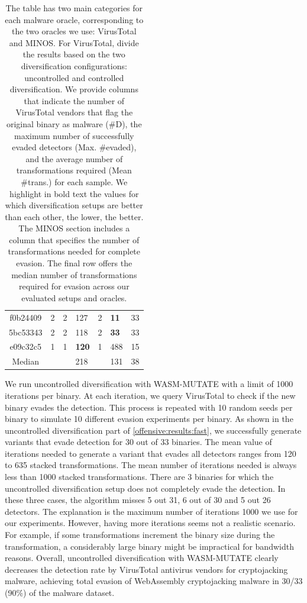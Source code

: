 \begin{table}
\begin{tabular}{c | r | r l | r l | t }
        f0b24409 &                  2 &         2       &  127  & 2 & \textbf{11} & 33 \\
        5bc53343 &                  2 &         2       &  118  & 2 & \textbf{33} & 33 \\
        e09c32c5 &                  1 &         1       &  \textbf{120}  & 1 & 488 & 15 \\
        \hline\hline
        Median &                         &         &      218  &   & 131 & 38
    \end{tabular}
    \caption{
        The table has two main categories for each malware oracle, corresponding to the two oracles we use: VirusTotal and MINOS. 
        For VirusTotal, divide the results based on the two diversification configurations: uncontrolled and controlled diversification. 
        We provide columns that indicate the number of VirusTotal vendors that flag the original binary as malware (\#D), the maximum number of successfully evaded detectors (Max. \#evaded), and the average number of transformations required (Mean \#trans.) for each sample. 
        We highlight in bold text the values for which diversification setups are better than each other, the lower, the better.
        The MINOS section includes a column that specifies the number of transformations needed for complete evasion. 
        The final row offers the median number of transformations required for evasion across our evaluated setups and oracles. 
    }
    \label{offensive:results:fast}
\end{table}


 We run uncontrolled diversification with WASM-MUTATE with a limit of 1000 iterations per binary. 
At each iteration, we query VirusTotal to check if the new binary evades the detection.
This process is repeated with 10 random seeds per binary to simulate 10 different evasion experiments per binary.
As shown in the uncontrolled diversification part of \autoref{offensive:results:fast}, we successfully generate variants that evade detection for 30 out of 33 binaries.
The mean value of iterations needed to generate a variant that evades all detectors ranges from 120 to 635 stacked transformations.
The mean number of iterations needed is always less than 1000 stacked transformations.
There are 3 binaries for which the uncontrolled diversification setup does not completely evade the detection. 
In these three cases, the algorithm misses 5 out 31, 6 out of 30 and 5 out 26 detectors.
The explanation is the maximum number of iterations 1000 we use for our experiments.
However, having more iterations seems not a realistic scenario.
For example, if some transformations increment the binary size during the transformation, a considerably large binary might be impractical for bandwidth reasons.
Overall, uncontrolled diversification with WASM-MUTATE clearly decreases the detection rate by VirusTotal antivirus vendors for cryptojacking malware, achieving total evasion of WebAssembly cryptojacking malware in 30/33 (90\%) of the malware dataset.


